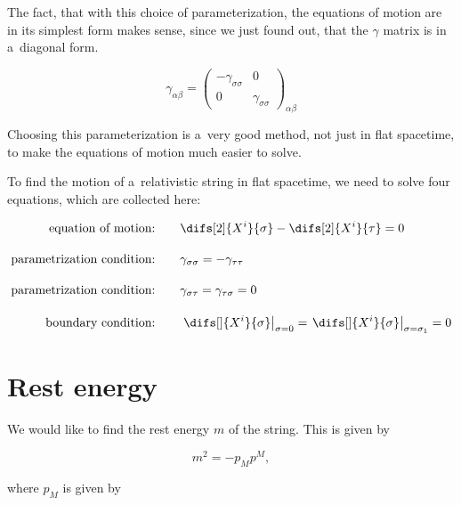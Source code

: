 \noindent
The fact, that with this choice of parameterization, the equations of motion are in its simplest form makes sense, since we just found out, that the $\gamma$ matrix is in a~diagonal form.

\begin{equation}
    \gamma_{\alpha \beta} = 
    \begin{pmatrix}
    -\gamma_{\sigma \sigma} & 0 \\
    0 & \gamma_{\sigma \sigma}
    \end{pmatrix}_{\alpha \beta}
\end{equation}

\noindent
Choosing this parameterization is a~very good method, not just in flat spacetime, to make the equations of motion much easier to solve.

To find the motion of a~relativistic string in flat spacetime, we need to solve four equations, which are collected here:

\begin{align}
    \text{equation of motion:} & \qquad \difs[2] {X^i} {\sigma} - \difs[2] {X^i} {\tau} = 0 
    \label{eq:wave_eq}\\[10pt]
    \text{parametrization condition:} & \qquad \gamma_{\sigma \sigma} = - \gamma_{\tau \tau}
    \label{eq:param_cond_1}\\[10pt]
    \text{parametrization condition:} & \qquad \gamma_{\sigma \tau} = \gamma_{\tau \sigma} = 0
    \label{eq:param_cond_2}\\[10pt]
    \text{boundary condition:} & \qquad \left. \difs[] {X^i} {\sigma} \right|_{\sigma = 0} = \left. \difs[] {X^i} {\sigma} \right|_{\sigma = \sigma_1} = 0
    \label{eq:boundary_condition_flat}
\end{align}


\section{Rest energy}
\label{sec:rest_energy}

We would like to find the rest energy $m$ of the string. This is given by

\begin{equation}
\label{eq:flat_rest_energy}
    m^2 = -p_M p^M,
\end{equation}

\noindent
where $p_M$ is given by \cite{zwiebach}

